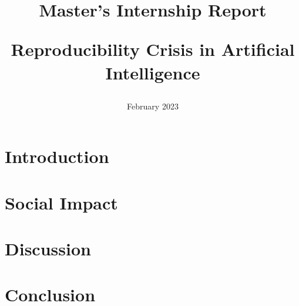 \documentclass{article}
\title{
  Master's Internship Report 

  Reproducibility Crisis in Artificial Intelligence

  
  }
\author{
    Ali Rahimi
    {\and}  
     \vspace{20mm}
    \texttt{[image: umlogo.png]}
    {\and}
  \vspace{25mm}Department of Advanced Computing Sciences
    {\and} 
      \vspace{5mm}  Maastricht University
    {\and} 
    Netherlands
}
\date{February 2023}
\begin{document}
\maketitle
\clearpage
\tableofcontents
\clearpage


\section{Introduction} 




\section{Social Impact}


\section{Discussion}



\section{Conclusion}






\medskip

\printbibliography

% 
\end{document}
